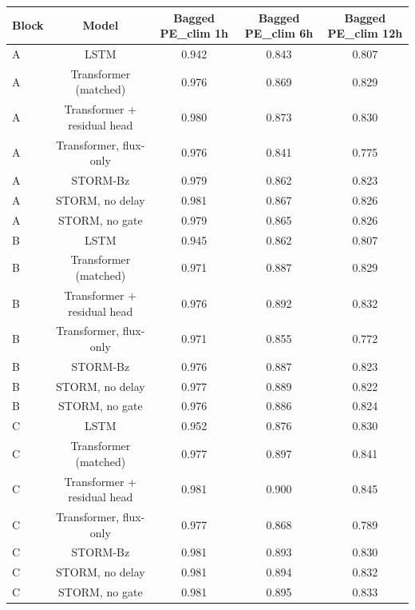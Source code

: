 \begin{tabular}{lcccc}
\toprule
Block & Model & Bagged PE\_clim 1h & Bagged PE\_clim 6h & Bagged PE\_clim 12h \\
\midrule
A & LSTM & 0.942 & 0.843 & 0.807 \\
A & Transformer (matched) & 0.976 & 0.869 & 0.829 \\
A & Transformer + residual head & 0.980 & 0.873 & 0.830 \\
A & Transformer, flux-only & 0.976 & 0.841 & 0.775 \\
A & STORM-Bz & 0.979 & 0.862 & 0.823 \\
A & STORM, no delay & 0.981 & 0.867 & 0.826 \\
A & STORM, no gate & 0.979 & 0.865 & 0.826 \\
B & LSTM & 0.945 & 0.862 & 0.807 \\
B & Transformer (matched) & 0.971 & 0.887 & 0.829 \\
B & Transformer + residual head & 0.976 & 0.892 & 0.832 \\
B & Transformer, flux-only & 0.971 & 0.855 & 0.772 \\
B & STORM-Bz & 0.976 & 0.887 & 0.823 \\
B & STORM, no delay & 0.977 & 0.889 & 0.822 \\
B & STORM, no gate & 0.976 & 0.886 & 0.824 \\
C & LSTM & 0.952 & 0.876 & 0.830 \\
C & Transformer (matched) & 0.977 & 0.897 & 0.841 \\
C & Transformer + residual head & 0.981 & 0.900 & 0.845 \\
C & Transformer, flux-only & 0.977 & 0.868 & 0.789 \\
C & STORM-Bz & 0.981 & 0.893 & 0.830 \\
C & STORM, no delay & 0.981 & 0.894 & 0.832 \\
C & STORM, no gate & 0.981 & 0.895 & 0.833 \\
\bottomrule
\end{tabular}
